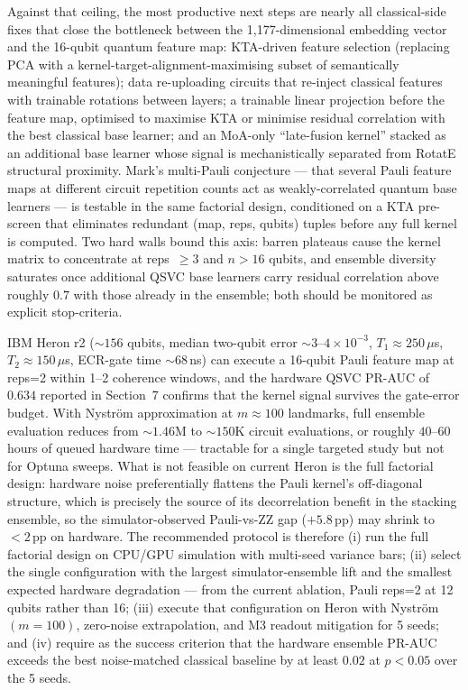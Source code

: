 \documentclass[twocolumn,10pt]{article}
\begin{document}
Against that ceiling, the most productive next steps are nearly all classical-side fixes that close the bottleneck between the 1{,}177-dimensional embedding vector and the 16-qubit quantum feature map: KTA-driven feature selection (replacing PCA with a kernel-target-alignment-maximising subset of semantically meaningful features); data re-uploading circuits that re-inject classical features with trainable rotations between layers; a trainable linear projection before the feature map, optimised to maximise KTA or minimise residual correlation with the best classical base learner; and an MoA-only ``late-fusion kernel'' stacked as an additional base learner whose signal is mechanistically separated from RotatE structural proximity. Mark's multi-Pauli conjecture --- that several Pauli feature maps at different circuit repetition counts act as weakly-correlated quantum base learners --- is testable in the same factorial design, conditioned on a KTA pre-screen that eliminates redundant (map, reps, qubits) tuples before any full kernel is computed. Two hard walls bound this axis: barren plateaus cause the kernel matrix to concentrate at reps~$\ge 3$ and $n > 16$ qubits, and ensemble diversity saturates once additional QSVC base learners carry residual correlation above roughly $0.7$ with those already in the ensemble; both should be monitored as explicit stop-criteria.

IBM Heron r2 (${\sim}156$ qubits, median two-qubit error $\sim 3$--$4\times 10^{-3}$, $T_{1}\approx 250\,\mu$s, $T_{2}\approx 150\,\mu$s, ECR-gate time ${\sim}68$\,ns) can execute a 16-qubit Pauli feature map at reps=2 within 1--2 coherence windows, and the hardware QSVC PR-AUC of $0.634$ reported in Section~7 confirms that the kernel signal survives the gate-error budget. With Nystr\"{o}m approximation at $m\approx 100$ landmarks, full ensemble evaluation reduces from ${\sim}1.46$M to ${\sim}150$K circuit evaluations, or roughly $40$--$60$ hours of queued hardware time --- tractable for a single targeted study but not for Optuna sweeps. What is not feasible on current Heron is the full factorial design: hardware noise preferentially flattens the Pauli kernel's off-diagonal structure, which is precisely the source of its decorrelation benefit in the stacking ensemble, so the simulator-observed Pauli-vs-ZZ gap ($+5.8$\,pp) may shrink to $<2$\,pp on hardware. The recommended protocol is therefore (i) run the full factorial design on CPU/GPU simulation with multi-seed variance bars; (ii) select the single configuration with the largest simulator-ensemble lift and the smallest expected hardware degradation --- from the current ablation, Pauli reps=2 at 12 qubits rather than 16; (iii) execute that configuration on Heron with Nystr\"{o}m$(m=100)$, zero-noise extrapolation, and M3 readout mitigation for 5 seeds; and (iv) require as the success criterion that the hardware ensemble PR-AUC exceeds the best noise-matched classical baseline by at least $0.02$ at $p<0.05$ over the 5 seeds.
\end{document}
